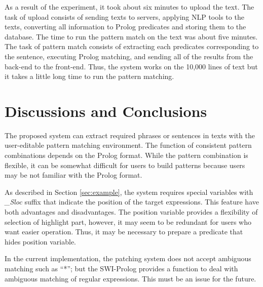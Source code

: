\documentclass[conference]{IEEEtran}
\begin{document}
As a result of the experiment, it took about six minutes to upload the text.
The task of upload consists of sending texts to servers, applying NLP tools
to the texts, converting all information to Prolog predicates and storing them
to the database. 
The time to run the pattern match on the text was about five minutes.
The task of pattern match consists of extracting each predicates corresponding to the sentence,
executing Prolog matching, and sending all of the results from the back-end to the front-end. 
Thus, the system works on the 10,000 lines of text but it takes a little long time to run
the pattern matching. 

\section{Discussions and Conclusions}
The proposed system can extract required phrases or sentences in texts with the user-editable
pattern matching environment. The function of consistent pattern combinations depends on the Prolog format.
While the pattern combination is flexible, it can be somewhat difficult for users to build patterns
because users may be not familiar with the Prolog format.

As described in Section \ref{sec:example},
the system requires special variables with {\it \_Sloc} suffix that indicate the position of the
target expressions. This feature have both advantages and disadvantages. The position variable
provides a flexibility of selection of highlight part, however, it may seem to be redundant for
users who want easier operation. Thus, it may be necessary to prepare a predicate that hides
position variable. 

In the current implementation, the patching system does not accept ambiguous matching such as ``*'';
but the SWI-Prolog provides a function to deal with ambiguous matching of regular expressions. 
This must be an issue for the future.








%

\end{document}
